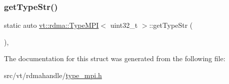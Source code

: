 \mbox{\label{structvt_1_1rdma_1_1_type_m_p_i_3_01uint32__t_01_4_ae991f187aeeaffdebe750c628a722642}} 
\subsubsection{\texorpdfstring{get\+Type\+Str()}{getTypeStr()}}
{\footnotesize\ttfamily static auto \hyperlink{structvt_1_1rdma_1_1_type_m_p_i}{vt\+::rdma\+::\+Type\+M\+PI}$<$ uint32\+\_\+t $>$\+::get\+Type\+Str (\begin{DoxyParamCaption}{ }\end{DoxyParamCaption})\hspace{0.3cm}{\ttfamily [inline]}, {\ttfamily [static]}}



The documentation for this struct was generated from the following file\+:\begin{DoxyCompactItemize}
\item 
src/vt/rdmahandle/\hyperlink{type__mpi_8h}{type\+\_\+mpi.\+h}\end{DoxyCompactItemize}
